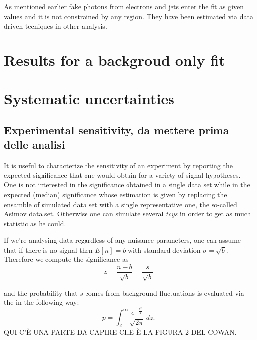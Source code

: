 As mentioned earlier fake photons from electrons and jets enter the fit as given values and it is not constrained by any region. They have been estimated via data driven tecniques in other analysis.

\section{Results for a backgroud only fit}

\section{Systematic uncertainties}


\subsection{Experimental sensitivity, da mettere prima delle analisi}
It is useful to characterize the sensitivity of an experiment by reporting the expected significance that one would obtain for a variety of signal hypotheses. One is not interested in the significance obtained in a single data set while in the expected (median) significance whose estimation is given by replacing the ensamble of simulated data set with a single representative one, the so-called Asimov data set. Otherwise one can simulate several \emph{toys} in order to get as much statistic as he could.

If we're analysing data regardless of any nuisance parameters, one can assume that if there is no signal then $E[n]=b$ with standard deviation $\sigma = \sqrt{b}$. Therefore we compute the significance as
\begin{equation}
  z=\frac{n-b}{\sqrt{b}}=\frac{s}{\sqrt{b}}
\end{equation}

and the probability that $s$ comes from background fluctuations is evaluated via the \p in the following way:
\begin{equation}
  p=\int_Z^\infty \frac{e^{-\frac{z^2}{2}}}{\sqrt{2\pi}}\,dz .
\end{equation}
QUI C'\`E UNA PARTE DA CAPIRE CHE \`E LA FIGURA 2 DEL COWAN.
